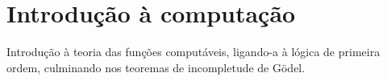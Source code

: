 \documentclass{report}
\theoremstyle{definition}
\theoremstyle{remark}
\begin{document}
	
	\chapter{Introdução à computação}
	
	Introdução à teoria das funções computáveis, ligando-a à lógica de primeira ordem, culminando nos teoremas de incompletude de Gödel.
	
	
	\nocite{fltc}
	\nocite{shoenfield}
	
	
	
\end{document}
